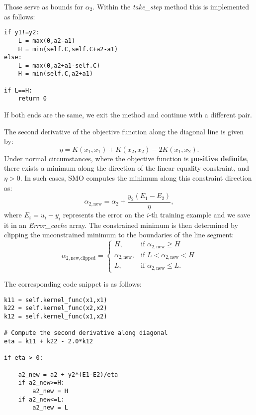 \documentclass[10pt,a4paper]{article}
\begin{document}
Those serve as bounds for \(\alpha_2\). Within the \textit{take\_step} method this is implemented as follows:

\begin{lstlisting}
if y1!=y2:
	L = max(0,a2-a1)
	H = min(self.C,self.C+a2-a1)
else:
	L = max(0,a2+a1-self.C)
	H = min(self.C,a2+a1)
	
if L==H:
	return 0
\end{lstlisting}
	
If both ends are the same, we exit the method and continue with a different pair.

The second derivative of the objective function along the diagonal line is given by:
\[
\eta = K(x_1, x_1) + K(x_2, x_2) - 2 K(x_1, x_2).
\]
Under normal circumstances, where the objective function is \textbf{positive definite}, there exists a minimum along the direction of the linear equality constraint, and \( \eta > 0 \). In such cases, SMO computes the minimum along this constraint direction as:
\[
\alpha_{2,\text{new}} = \alpha_2 + \frac{y_2 (E_1 - E_2)}{\eta},
\]
where \( E_i = u_i - y_i \) represents the error on the \( i \)-th training example and we save it in an \textit{Error\_cache} array.
The constrained minimum is then determined by clipping the unconstrained minimum to the boundaries of the line segment:
\[
\alpha_{2,\text{new,clipped}} =
\begin{cases}
	H, & \text{if } \alpha_{2,\text{new}} \geq H \\
	\alpha_{2,\text{new}}, & \text{if } L < \alpha_{2,\text{new}} < H \\
	L, & \text{if } \alpha_{2,\text{new}} \leq L.
\end{cases}
\]


The corresponding code snippet is as follows:

\begin{lstlisting}
k11 = self.kernel_func(x1,x1)
k22 = self.kernel_func(x2,x2)
k12 = self.kernel_func(x1,x2)
	
# Compute the second derivative along diagonal
eta = k11 + k22 - 2.0*k12
	
if eta > 0:

	a2_new = a2 + y2*(E1-E2)/eta	
	if a2_new>=H:
		a2_new = H
	if a2_new<=L:
		a2_new = L
\end{lstlisting}
\end{document}
